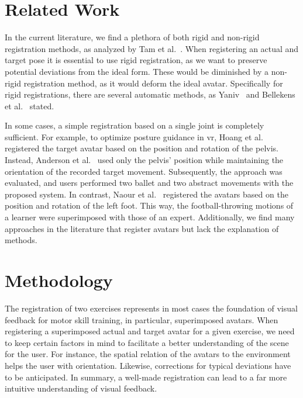 \section{Related Work \label{sec:relReg}}
In the current literature, we find a plethora of both rigid and non-rigid registration methods, as analyzed by Tam et al.~\cite{tam2012registration}. When registering an actual and target pose it is essential to use rigid registration, as we want to preserve potential deviations from the ideal form. These would be diminished by a non-rigid registration method, as it would deform the ideal avatar. Specifically for rigid registrations, there are several automatic methods, as Yaniv~\cite{yaniv2008rigid} and Bellekens et al.~\cite{bellekens2014survey} stated.

In some cases, a simple registration based on a single joint is completely sufficient. For example, to optimize posture guidance in \acrshort{vr}, Hoang et al.~\cite{hoang2016onebody} registered the target avatar based on the position and rotation of the pelvis. Instead, Anderson et al.~\cite{anderson2013youmove} used only the pelvis' position while maintaining the orientation of the recorded target movement. Subsequently, the approach was evaluated, and users performed two ballet and two abstract movements with the proposed system. In contrast, Naour et al.~\cite{naour2019superimpose} registered the avatars based on the position and rotation of the left foot. This way, the football-throwing motions of a learner were superimposed with those of an expert. Additionally, we find many approaches in the literature that register avatars but lack the explanation of methods.

\section{Methodology \label{sec:methReg}}
The registration of two exercises represents in most cases the foundation of visual feedback for motor skill training, in particular, superimposed avatars. When registering a superimposed actual and target avatar for a given exercise, we need to keep certain factors in mind to facilitate a better understanding of the scene for the user. For instance, the spatial relation of the avatars to the environment helps the user with orientation. Likewise, corrections for typical deviations have to be anticipated. In summary, a well-made registration can lead to a far more intuitive understanding of visual feedback.

